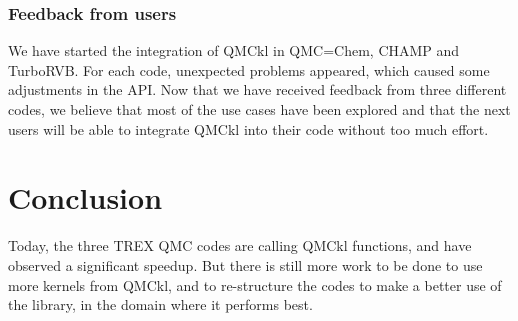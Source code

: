 \subsubsection{Feedback from users}

We have started the integration of QMCkl in QMC=Chem, CHAMP and
TurboRVB. For each code, unexpected problems appeared, which caused some
adjustments in the \ac{API}. Now that we have received feedback from three
different codes, we believe that most of the use cases have been
explored and that the next users will be able to integrate QMCkl into
their code without too much effort.

\section{Conclusion}

Today, the three TREX QMC codes are calling QMCkl functions, and have
observed a significant speedup. But there is still more work to be
done to use more kernels from QMCkl, and to re-structure the codes to
make a better use of the library, in the domain where it performs best.

